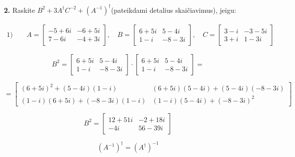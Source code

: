 \documentclass{article}
\begin{document}






\pagebreak


\textbf{2.} Raskite  \(B^2+3A ^{\dag} C^{-2}+(A^{-1})^{\dag}  \)(pateikdami detalius skaičiavimus), jeigu:



\begin{align}
\text{1)}\qquad
A =
\begin{bmatrix}
-5+6i & -6+5i \\
7-6i & -4+3i
\end{bmatrix}, \quad
B=
\begin{bmatrix}
6+5i & 5-4i \\
1-i & -8-3i
\end{bmatrix}, \quad
C=
\begin{bmatrix}
3-i & -3-5i \\
3+i & 1-3i
\end{bmatrix}
 \nonumber
\end{align}


\begin{equation}
    B^2=
    \begin{bmatrix}
6+5i & 5-4i \\
1-i & -8-3i
\end{bmatrix}
\cdot
\begin{bmatrix}
6+5i & 5-4i \\
1-i & -8-3i
\end{bmatrix}
=\nonumber
\end{equation}

\begin{equation}
=
\begin{bmatrix}
(6+5i)^2+(5-4i)(1-i) & (6+5i)(5-4i)+ (5-4i)(-8-3i)\\
(1-i)(6+5i)+ (-8-3i)(1-i)& (1-i)(5-4i)+(-8-3i)^2
\end{bmatrix}\nonumber
\end{equation}

\begin{equation}
B^2=
\begin{bmatrix}
12+51i & -2+18i\\
-4i & 56-39i\nonumber
\end{bmatrix}
\end{equation}

\begin{equation}
    (A^{-1})^{\dag}  = (A^{\dag})^{-1}\nonumber
\end{equation}
\end{document}
